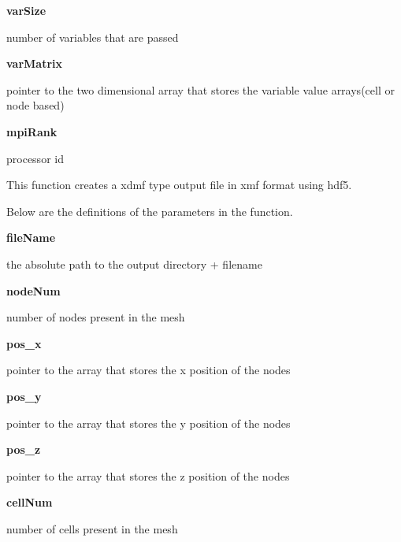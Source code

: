 \documentclass{article}
\begin{document}
        {\bf varSize} \par number of variables that are passed 
\medskip
        
        {\bf varMatrix} \par pointer to the two dimensional array that stores the variable value arrays(cell or node based) 
\medskip
        
        {\bf mpiRank} \par processor id

\newpage

\bigskip

        \par This function creates a xdmf type output file in xmf format using hdf5.
\bigskip
        
        \par Below are the definitions of the parameters in the function.
\medskip

        {\bf fileName}  \par the absolute path to the output directory + filename
\medskip
        
        {\bf nodeNum} \par number of nodes present in the mesh
\medskip
        
        {\bf pos\_x} \par pointer to the array that stores the x position of the nodes
\medskip
        
        {\bf pos\_y} \par pointer to the array that stores the y position of the nodes
\medskip
        
        {\bf pos\_z} \par pointer to the array that stores the z position of the nodes
\medskip
        
        {\bf cellNum} \par number of cells present in the mesh
\medskip
        
\end{document}
